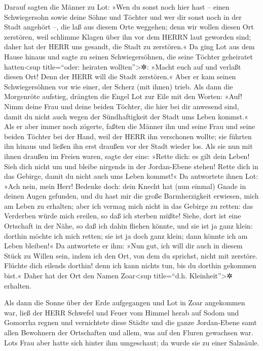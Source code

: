  Darauf sagten die Männer zu Lot: »Wen du sonst noch hier
hast -- einen Schwiegersohn sowie deine Söhne und Töchter und wer dir
sonst noch in der Stadt angehört --, die laß aus diesem Orte weggehen;
 denn wir wollen diesen Ort zerstören, weil schlimme
Klagen über ihn vor dem HERRN laut geworden sind; daher hat der HERR uns
gesandt, die Stadt zu zerstören.«  Da ging Lot aus dem
Hause hinaus und sagte zu seinen Schwiegersöhnen, die seine Töchter
geheiratet hatten\textless sup title=``oder: heiraten
wollten''\textgreater✲: »Macht euch auf und verlaßt diesen Ort! Denn der
HERR will die Stadt zerstören.« Aber er kam seinen Schwiegersöhnen vor
wie einer, der Scherz (mit ihnen) trieb.  Als dann die
Morgenröte aufstieg, drängten die Engel Lot zur Eile mit den Worten:
»Auf! Nimm deine Frau und deine beiden Töchter, die hier bei dir
anwesend sind, damit du nicht auch wegen der Sündhaftigkeit der Stadt
ums Leben kommst.«  Als er aber immer noch zögerte,
faßten die Männer ihn und seine Frau und seine beiden Töchter bei der
Hand, weil der HERR ihn verschonen wollte; sie führten ihn hinaus und
ließen ihn erst draußen vor der Stadt wieder los.  Als
sie nun mit ihnen draußen im Freien waren, sagte der eine: »Rette dich:
es gilt dein Leben! Sieh dich nicht um und bleibe nirgends in der
Jordan-Ebene stehen! Rette dich in das Gebirge, damit du nicht auch ums
Leben kommst!«  Da antwortete ihnen Lot: »Ach nein, mein
Herr!  Bedenke doch: dein Knecht hat (nun einmal) Gnade
in deinen Augen gefunden, und du hast mir die große Barmherzigkeit
erwiesen, mich am Leben zu erhalten; aber ich vermag mich nicht in das
Gebirge zu retten: das Verderben würde mich ereilen, so daß ich sterben
müßte!  Siehe, dort ist eine Ortschaft in der Nähe, so
daß ich dahin fliehen könnte, und sie ist ja ganz klein: dorthin möchte
ich mich retten; sie ist ja doch ganz klein; dann könnte ich am Leben
bleiben!«  Da antwortete er ihm: »Nun gut, ich will dir
auch in diesem Stück zu Willen sein, indem ich den Ort, von dem du
sprichst, nicht mit zerstöre.  Flüchte dich eilends
dorthin! denn ich kann nichts tun, bis du dorthin gekommen bist.« Daher
hat der Ort den Namen Zoar\textless sup title=``d.h.
Kleinheit''\textgreater✲ erhalten.

 Als dann die Sonne über der Erde aufgegangen und Lot in
Zoar angekommen war,  ließ der HERR Schwefel und Feuer
vom Himmel herab auf Sodom und Gomorrha regnen  und
vernichtete diese Städte und die ganze Jordan-Ebene samt allen Bewohnern
der Ortschaften und allem, was auf den Fluren gewachsen war.
 Lots Frau aber hatte sich hinter ihm umgeschaut; da
wurde sie zu einer Salzsäule.

